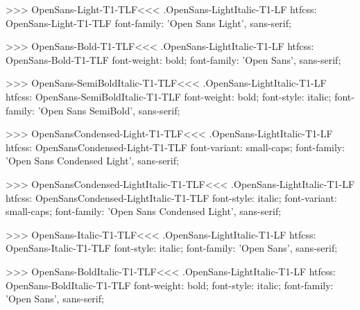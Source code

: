 >>>
\<OpenSans-Light-T1-TLF\><<<
.OpenSans-LightItalic-T1-LF
htfcss:  OpenSans-Light-T1-TLF  font-family: 'Open Sans Light', sans-serif;

>>>
\<OpenSans-Bold-T1-TLF\><<<
.OpenSans-LightItalic-T1-LF
htfcss:  OpenSans-Bold-T1-TLF  font-weight: bold; font-family: 'Open Sans', sans-serif;

>>>
\<OpenSans-SemiBoldItalic-T1-TLF\><<<
.OpenSans-LightItalic-T1-LF
htfcss:  OpenSans-SemiBoldItalic-T1-TLF  font-weight: bold; font-style: italic; font-family: 'Open Sans SemiBold', sans-serif;

>>>
\<OpenSansCondensed-Light-T1-TLF\><<<
.OpenSans-LightItalic-T1-LF
htfcss:  OpenSansCondensed-Light-T1-TLF  font-variant: small-caps; font-family: 'Open Sans Condensed Light', sans-serif;

>>>
\<OpenSansCondensed-LightItalic-T1-TLF\><<<
.OpenSans-LightItalic-T1-LF
htfcss:  OpenSansCondensed-LightItalic-T1-TLF  font-style: italic; font-variant: small-caps; font-family: 'Open Sans Condensed Light', sans-serif;

>>>
\<OpenSans-Italic-T1-TLF\><<<
.OpenSans-LightItalic-T1-LF
htfcss:  OpenSans-Italic-T1-TLF  font-style: italic; font-family: 'Open Sans', sans-serif;

>>>
\<OpenSans-BoldItalic-T1-TLF\><<<
.OpenSans-LightItalic-T1-LF
htfcss:  OpenSans-BoldItalic-T1-TLF  font-weight: bold; font-style: italic; font-family: 'Open Sans', sans-serif;


